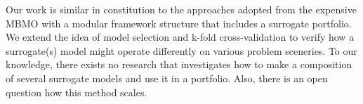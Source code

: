         Our work is similar in constitution to the approaches adopted from the expensive MBMO \cite{SoftSurvey} with a modular framework structure that includes a surrogate portfolio. We extend the idea of model selection and k-fold cross-validation to verify how a surrogate(s) model might operate differently on various problem sceneries. To our knowledge, there exists no research that investigates how to make a composition of several surrogate models and use it in a portfolio. Also, there is an open question how this method scales.

















        
